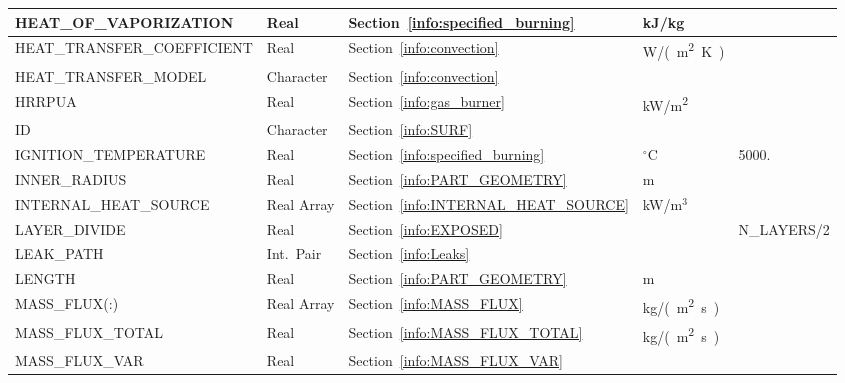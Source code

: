 \documentclass[11pt]{book}
\begin{document}
\begin{longtable}{@{\extracolsep{\fill}}|l|l|l|l|l|}
{\ct HEAT\_OF\_VAPORIZATION}          & Real            & Section~\ref{info:specified_burning}      & kJ/kg               &                         \\ \hline
{\ct HEAT\_TRANSFER\_COEFFICIENT}     & Real            & Section~\ref{info:convection}             & \si{W/(m^2.K)}      &                         \\ \hline
{\ct HEAT\_TRANSFER\_MODEL}           & Character       & Section~\ref{info:convection}             &                     &                         \\ \hline
{\ct HRRPUA}                          & Real            & Section~\ref{info:gas_burner}             & \si{kW/m^2}         &                         \\ \hline
{\ct ID}                              & Character       & Section~\ref{info:SURF}                   &                     &                         \\ \hline
{\ct IGNITION\_TEMPERATURE}           & Real            & Section~\ref{info:specified_burning}      & $^\circ$C           & 5000.                   \\ \hline
{\ct INNER\_RADIUS}                   & Real            & Section~\ref{info:PART_GEOMETRY}          & m                   &                         \\ \hline
{\ct INTERNAL\_HEAT\_SOURCE}          & Real Array      & Section~\ref{info:INTERNAL_HEAT_SOURCE}   & kW/m$^3$            &                         \\ \hline
{\ct LAYER\_DIVIDE}                   & Real            & Section~\ref{info:EXPOSED}                &                     & {\ct N\_LAYERS}/2       \\ \hline
{\ct LEAK\_PATH}                      & Int.~Pair       & Section~\ref{info:Leaks}                  &                     &                         \\ \hline
{\ct LENGTH}                          & Real            & Section~\ref{info:PART_GEOMETRY}          & m                   &                         \\ \hline
{\ct MASS\_FLUX(:)}                   & Real Array      & Section~\ref{info:MASS_FLUX}              & \si{kg/(m^2.s)}     &                         \\ \hline
{\ct MASS\_FLUX\_TOTAL}               & Real            & Section~\ref{info:MASS_FLUX_TOTAL}        & \si{kg/(m^2.s)}     &                         \\ \hline
{\ct MASS\_FLUX\_VAR}                 & Real            & Section~\ref{info:MASS_FLUX_VAR}          &                     &                         \\ \hline

\end{longtable}
\end{document}
